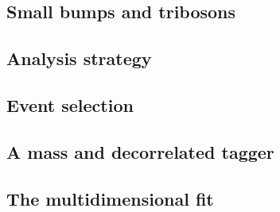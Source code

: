 \subsection{Small bumps and tribosons}
\subsection{Analysis strategy}
\subsection{Event selection}
\subsection{A mass and \PT decorrelated tagger}
\label{sec:searchIII:ddt}
\subsection{The multidimensional fit}